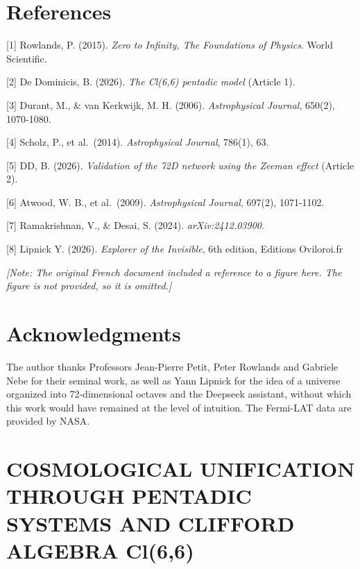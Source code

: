 \documentclass[11pt]{article}
\begin{document}
\hypertarget{references-2}{%
\section{References}\label{references-2}}

{[}1{]} Rowlands, P. (2015). \emph{Zero to Infinity, The Foundations of
Physics}. World Scientific.

{[}2{]} De Dominicis, B. (2026). \emph{The Cl(6,6) pentadic model}
(Article 1).

{[}3{]} Durant, M., \& van Kerkwijk, M. H. (2006). \emph{Astrophysical
Journal}, 650(2), 1070-1080.

{[}4{]} Scholz, P., et al.~(2014). \emph{Astrophysical Journal}, 786(1),
63.

{[}5{]} DD, B. (2026). \emph{Validation of the 72D network using the
Zeeman effect} (Article 2).

{[}6{]} Atwood, W. B., et al.~(2009). \emph{Astrophysical Journal},
697(2), 1071-1102.

{[}7{]} Ramakrishnan, V., \& Desai, S. (2024). \emph{arXiv:2412.03900}.

{[}8{]} Lipnick Y. (2026). \emph{Explorer of the Invisible}, 6th
edition, Editions Oviloroi.fr

\emph{{[}Note: The original French document included a reference to a
figure here. The figure is not provided, so it is omitted.{]}}

\hypertarget{acknowledgments-2}{%
\section{Acknowledgments}\label{acknowledgments-2}}

The author thanks Professors Jean-Pierre Petit, Peter Rowlands and
Gabriele Nebe for their seminal work, as well as Yann Lipnick for the
idea of a universe organized into 72-dimensional octaves and the
Deepseek assistant, without which this work would have remained at the
level of intuition. The Fermi-LAT data are provided by NASA.

\clearpage
{}

\hypertarget{cosmological-unification-through-pentadic-systems-and-clifford-algebra-cl66}{%
\section{COSMOLOGICAL UNIFICATION THROUGH PENTADIC SYSTEMS AND CLIFFORD
ALGEBRA
Cl(6,6)}\label{cosmological-unification-through-pentadic-systems-and-clifford-algebra-cl66}}
\end{document}
